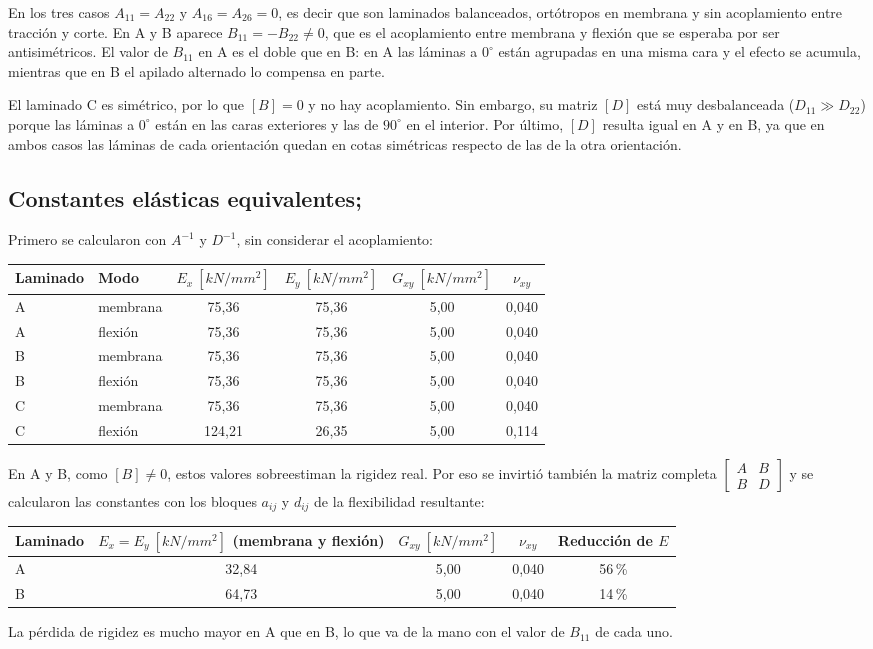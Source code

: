 \documentclass[11pt,a4paper]{article}
\newcommand{\Eeq}{\si{kN/mm^2}}
\begin{document}
En los tres casos $A_{11}=A_{22}$ y $A_{16}=A_{26}=0$, es decir que son laminados balanceados, ortótropos en membrana y sin acoplamiento entre tracción y corte. En A y B aparece $B_{11}=-B_{22}\neq0$, que es el acoplamiento entre membrana y flexión que se esperaba por ser antisimétricos. El valor de $B_{11}$ en A es el doble que en B: en A las láminas a $0^\circ$ están agrupadas en una misma cara y el efecto se acumula, mientras que en B el apilado alternado lo compensa en parte.

El laminado C es simétrico, por lo que $[B]=0$ y no hay acoplamiento. Sin embargo, su matriz $[D]$ está muy desbalanceada ($D_{11}\gg D_{22}$) porque las láminas a $0^\circ$ están en las caras exteriores y las de $90^\circ$ en el interior. Por último, $[D]$ resulta igual en A y en B, ya que en ambos casos las láminas de cada orientación quedan en cotas simétricas respecto de las de la otra orientación.

\subsection{Constantes elásticas equivalentes;}
Primero se calcularon con $A^{-1}$ y $D^{-1}$, sin considerar el acoplamiento:
\begin{center}
\begin{tabular}{llcccc}
\toprule
Laminado & Modo & $E_x\ [\Eeq]$ & $E_y\ [\Eeq]$ & $G_{xy}\ [\Eeq]$ & $\nu_{xy}$ \\
\midrule
A & membrana & 75,36 & 75,36 & 5,00 & 0,040 \\
A & flexión  & 75,36 & 75,36 & 5,00 & 0,040 \\
B & membrana & 75,36 & 75,36 & 5,00 & 0,040 \\
B & flexión  & 75,36 & 75,36 & 5,00 & 0,040 \\
C & membrana & 75,36 & 75,36 & 5,00 & 0,040 \\
C & flexión  & 124,21 & 26,35 & 5,00 & 0,114 \\
\bottomrule
\end{tabular}
\end{center}

En A y B, como $[B]\neq0$, estos valores sobreestiman la rigidez real. Por eso se invirtió también la matriz completa $\begin{bmatrix}A&B\\B&D\end{bmatrix}$ y se calcularon las constantes con los bloques $a_{ij}$ y $d_{ij}$ de la flexibilidad resultante:
\begin{center}
\begin{tabular}{lcccc}
\toprule
Laminado & $E_x=E_y\ [\Eeq]$ (membrana y flexión) & $G_{xy}\ [\Eeq]$ & $\nu_{xy}$ & Reducción de $E$ \\
\midrule
A & 32,84 & 5,00 & 0,040 & 56\,\% \\
B & 64,73 & 5,00 & 0,040 & 14\,\% \\
\bottomrule
\end{tabular}
\end{center}
La pérdida de rigidez es mucho mayor en A que en B, lo que va de la mano con el valor de $B_{11}$ de cada uno.
\end{document}
